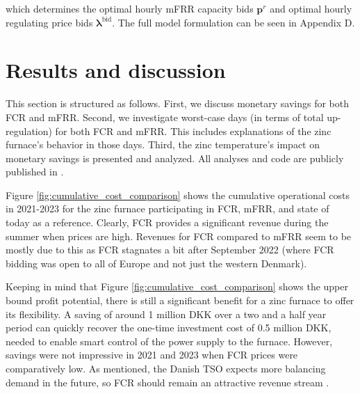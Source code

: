 \documentclass[conference]{IEEEtran}
\begin{document}
\endgroup
which determines the optimal hourly mFRR capacity bids $\bm{p}^{r}$ and optimal hourly regulating price bids $\bm{\lambda}^{\text{bid}}$. The full model formulation can be seen in Appendix D.


\section{Results and discussion}

This section is structured as follows. First, we discuss monetary savings for both FCR and mFRR. Second, we investigate worst-case days (in terms of total up-regulation) for both FCR and mFRR. This includes explanations of the zinc furnace's behavior in those days. Third, the zinc temperature's impact on monetary savings is presented and analyzed. All analyses and code are publicly published in \cite{code}.

Figure \ref{fig:cumulative_cost_comparison} shows the cumulative operational costs in 2021-2023 for the zinc furnace participating in FCR, mFRR, and state of today as a reference. Clearly, FCR provides a significant revenue during the summer when prices are high. Revenues for FCR compared to mFRR seem to be mostly due to this as FCR stagnates a bit after September 2022 (where FCR bidding was open to all of Europe and not just the western Denmark).

Keeping in mind that Figure \ref{fig:cumulative_cost_comparison} shows the upper bound profit potential, there is still a significant benefit for a zinc furnace to offer its flexibility. A saving of around 1 million DKK over a two and a half year period can quickly recover the one-time investment cost of 0.5 million DKK, needed to enable smart control of the power supply to the furnace. However, savings were not impressive in 2021 and 2023 when FCR prices were comparatively low. As mentioned, the Danish TSO expects more balancing demand in the future, so FCR should remain an attractive revenue stream \cite{energinet:scenario_report_2022}.
\end{document}
